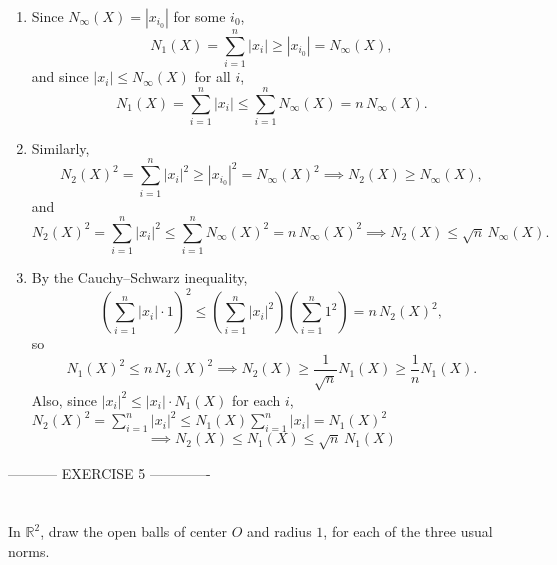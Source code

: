 \documentclass[12pt]{article}
\begin{document}
\begin{correctionbox}
\begin{enumerate}
    \item Since \( N_\infty(X) = |x_{i_0}| \) for some \( i_0 \),
    \[
    N_1(X) = \sum_{i=1}^n |x_i| \geq |x_{i_0}| = N_\infty(X),
    \]
    and since \( |x_i| \leq N_\infty(X) \) for all \( i \),
    \[
    N_1(X) = \sum_{i=1}^n |x_i| \leq \sum_{i=1}^n N_\infty(X) = n\, N_\infty(X).
    \]

    \item Similarly,
    \[
    N_2(X)^2 = \sum_{i=1}^n |x_i|^2 \geq |x_{i_0}|^2 = N_\infty(X)^2 \implies N_2(X) \geq N_\infty(X),
    \]
    and
    \[
    N_2(X)^2 = \sum_{i=1}^n |x_i|^2 \leq \sum_{i=1}^n N_\infty(X)^2 = n\, N_\infty(X)^2 \implies N_2(X) \leq \sqrt{n}\, N_\infty(X).
    \]

    \item By the Cauchy--Schwarz inequality,
    \[
    \left( \sum_{i=1}^n |x_i| \cdot 1 \right)^2 \leq \left( \sum_{i=1}^n |x_i|^2 \right) \left( \sum_{i=1}^n 1^2 \right) = n\, N_2(X)^2,
    \]
    so
    \[
    N_1(X)^2 \leq n\, N_2(X)^2 \implies N_2(X) \geq \frac{1}{\sqrt{n}} N_1(X) \geq \frac{1}{n} N_1(X).
    \]
    Also, since \( |x_i|^2 \leq |x_i| \cdot N_1(X) \) for each \( i \), 
    $N_2(X)^2 = \sum_{i=1}^n |x_i|^2 \leq N_1(X) \sum_{i=1}^n |x_i| = N_1(X)^2$ 
    $$\implies N_2(X) \leq N_1(X) \leq \sqrt{n}\, N_1(X)$$
\end{enumerate}
\end{correctionbox}

----------- EXERCISE 5 -------------                                                                                                   
\section{}
In $\mathbb{R}^{2}$, draw the open balls of center $O$ and radius $1$, for each of the three usual norms.
\end{document}
